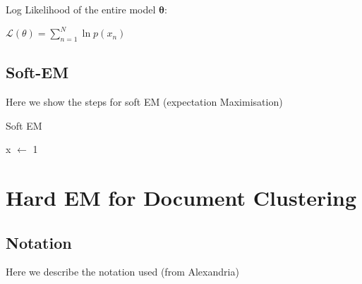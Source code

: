 \documentclass[a4paper]{article}
\begin{document}
	Log Likelihood of the entire model $\mathbf{\theta}$:
	
	$\mathcal{L}(\theta) = \sum_{n=1}^N\ln p(x_n)$
	
	
	\subsection{Soft-EM}
	Here we show the steps for soft EM (expectation Maximisation) 
	
	\begin{algorithm}
		\caption{Soft EM}
		\begin{algorithmic}[1]
			 
			
			\State x $\gets$ 1
			
			\EndProcedure
		\end{algorithmic}
	\end{algorithm}
	
	\section{Hard EM for Document Clustering}
	
	\subsection{Notation}
	
	Here we describe the notation used (from Alexandria)
	
\end{document}
